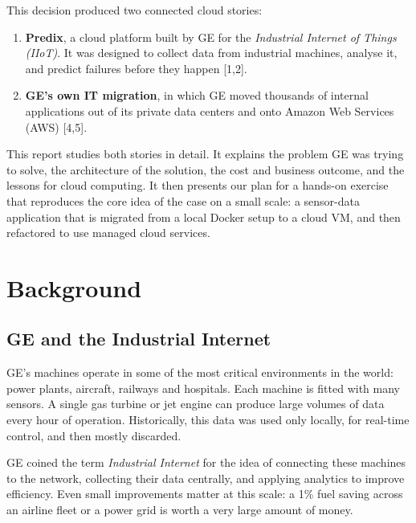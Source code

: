 \documentclass[12pt,a4paper]{article}
\begin{document}
This decision produced two connected cloud stories:
\begin{enumerate}
  \item \textbf{Predix}, a cloud platform built by GE for the \emph{Industrial Internet of Things (IIoT)}. It was
        designed to collect data from industrial machines, analyse it, and predict failures before they happen [1,2].
  \item \textbf{GE's own IT migration}, in which GE moved thousands of internal applications out of its private
        data centers and onto Amazon Web Services (AWS) [4,5].
\end{enumerate}

This report studies both stories in detail. It explains the problem GE was trying to solve, the architecture of the
solution, the cost and business outcome, and the lessons for cloud computing. It then presents our plan for a
hands-on exercise that reproduces the core idea of the case on a small scale: a sensor-data application that is
migrated from a local Docker setup to a cloud VM, and then refactored to use managed cloud services.

\section{Background}
\subsection{GE and the Industrial Internet}
GE's machines operate in some of the most critical environments in the world: power plants, aircraft, railways and
hospitals. Each machine is fitted with many sensors. A single gas turbine or jet engine can produce large volumes of
data every hour of operation. Historically, this data was used only locally, for real-time control, and then mostly
discarded.

GE coined the term \emph{Industrial Internet} for the idea of connecting these machines to the network, collecting
their data centrally, and applying analytics to improve efficiency. Even small improvements matter at this scale:
a 1\% fuel saving across an airline fleet or a power grid is worth a very large amount of money.
\end{document}
